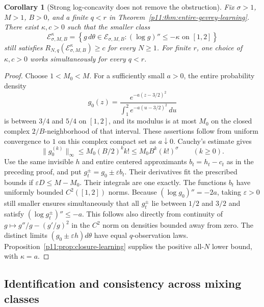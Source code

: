 \documentclass[11pt,letterpaper]{article}
\newtheorem{corollary}[theorem]{Corollary}
\theoremstyle{definition}
\theoremstyle{remark}
\newcommand{\1}{\mathbf 1}
\begin{document}
\begin{corollary}[Strong log-concavity does not remove the obstruction]
\label{p11:cor:logconcave-analytic-learning}
Fix $\sigma>1$, $M>1$, $B>0$, and a finite $q<r$ in
Theorem~\ref{p11:thm:entire-gevrey-learning}.  There exist $\kappa,c>0$
such that the smaller class
\[
 \mathcal E_{\sigma,M,B}^{\kappa}
 =\left\{g\,d\theta\in\mathcal E_{\sigma,M,B}:
                (\log g)''\leq-\kappa\text{ on }[1,2]\right\}
\]
still satisfies $R_{N,q}(\mathcal E_{\sigma,M,B}^{\kappa})\geq c$
for every $N\geq1$.  For finite $r$, one choice of $\kappa,c>0$
works simultaneously for every $q<r$.
\end{corollary}

\begin{proof}
Choose $1<M_0<M$.  For a sufficiently small $a>0$, the entire
probability density
\[
 g_0(z)=\frac{e^{-a(z-3/2)^2}}
                   {\int_1^2e^{-a(u-3/2)^2}\,du}
\]
is between $3/4$ and $5/4$ on $[1,2]$, and its modulus is at most
$M_0$ on the closed complex $2/B$-neighborhood of that interval.
These assertions follow from uniform convergence to $1$ on this
complex compact set as $a\downarrow0$.  Cauchy's estimate gives
\[
 \|g_0^{(k)}\|_\infty\leq M_0(B/2)^k k!
        \leq M_0B^k(k!)^\sigma\qquad(k\geq0).
\]
Use the same invisible $h$ and entire centered approximants
$b_t=h_t-c_t$ as in the preceding proof, and put
$g_t^\pm=g_0\pm\varepsilon b_t$.
Their derivatives fit the prescribed bounds if
$\varepsilon D\leq M-M_0$.  Their integrals are one exactly.
The functions $b_t$ have uniformly bounded $C^2([1,2])$ norms.
Because $(\log g_0)''=-2a$, taking $\varepsilon>0$ still smaller
ensures simultaneously that all $g_t^\pm$ lie between $1/2$ and
$3/2$ and satisfy $(\log g_t^\pm)''\leq-a$.
This follows also directly from continuity of
$g\mapsto g''/g-(g'/g)^2$ in the $C^2$ norm on densities bounded
away from zero.  The distinct limits
$(g_0\pm\varepsilon h)d\theta$ have equal $q$-observation laws.
Proposition~\ref{p11:prop:closure-learning} supplies the positive
all-$N$ lower bound, with $\kappa=a$.
\end{proof}



\subsection{Identification and consistency across mixing classes}
\end{document}
